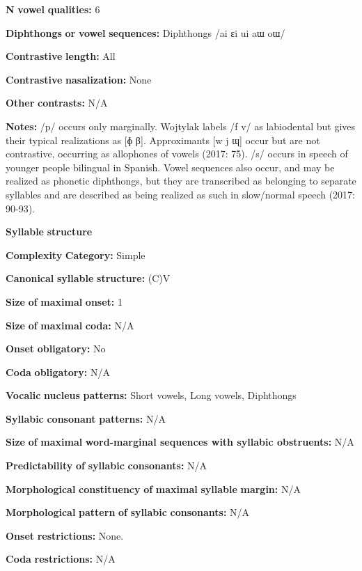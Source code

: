 \textbf{N} \textbf{vowel} \textbf{qualities:} 6

\textbf{Diphthongs} \textbf{or} \textbf{vowel} \textbf{sequences:} Diphthongs /ai ɛi ui aɯ oɯ/

\textbf{Contrastive} \textbf{length:} All

\textbf{Contrastive} \textbf{nasalization:} None

\textbf{Other} \textbf{contrasts:} N/A

\textbf{Notes:} /p/ occurs only marginally. Wojtylak labels /f v/ as labiodental but gives their typical realizations as [ɸ β]. Approximants [w j ɰ] occur but are not contrastive, occurring as allophones of vowels (2017: 75). /s/ occurs in speech of younger people bilingual in Spanish. Vowel sequences also occur, and may be realized as phonetic diphthongs, but they are transcribed as belonging to separate syllables and are described as being realized as such in slow/normal speech (2017: 90-93).

\textbf{Syllable} \textbf{structure}

\textbf{Complexity} \textbf{Category:} Simple

\textbf{Canonical} \textbf{syllable} \textbf{structure:} (C)V \citep[93-95]{Wojtylak2017}

\textbf{Size} \textbf{of} \textbf{maximal} \textbf{onset:} 1

\textbf{Size} \textbf{of} \textbf{maximal} \textbf{coda:} N/A

\textbf{Onset} \textbf{obligatory:} No

\textbf{Coda} \textbf{obligatory:} N/A

\textbf{Vocalic} \textbf{nucleus} \textbf{patterns:} Short vowels, Long vowels, Diphthongs

\textbf{Syllabic} \textbf{consonant} \textbf{patterns:} N/A

\textbf{Size} \textbf{of} \textbf{maximal} \textbf{word{}-marginal sequences with syllabic obstruents:} N/A

\textbf{Predictability} \textbf{of} \textbf{syllabic} \textbf{consonants:} N/A

\textbf{Morphological} \textbf{constituency} \textbf{of} \textbf{maximal} \textbf{syllable} \textbf{margin:} N/A

\textbf{Morphological} \textbf{pattern} \textbf{of} \textbf{syllabic} \textbf{consonants:} N/A

\textbf{Onset} \textbf{restrictions:} None.

\textbf{Coda} \textbf{restrictions:} N/A

